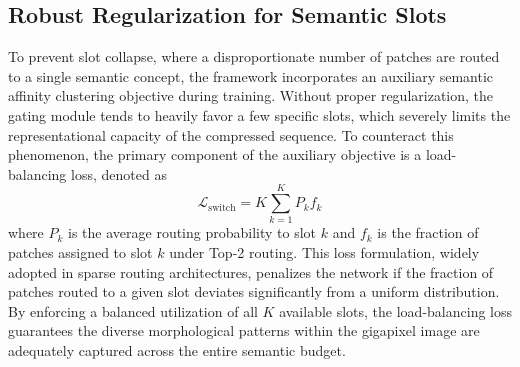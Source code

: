 \documentclass[runningheads]{llncs}
\begin{document}
\subsection{Robust Regularization for Semantic Slots}
To prevent slot collapse, where a disproportionate number of patches are routed to a single semantic concept, the framework incorporates an auxiliary semantic affinity clustering objective during training. Without proper regularization, the gating module tends to heavily favor a few specific slots, which severely limits the representational capacity of the compressed sequence. To counteract this phenomenon, the primary component of the auxiliary objective is a load-balancing loss, denoted as 
\begin{equation}
\mathcal{L}_{\text{switch}}
= K \sum_{k=1}^{K} P_k f_k
\end{equation}
where $P_k$ is the average routing probability to slot $k$ and $f_k$ is the fraction of patches assigned to slot $k$ under Top-2 routing. This loss formulation, widely adopted in sparse routing architectures, penalizes the network if the fraction of patches routed to a given slot deviates significantly from a uniform distribution. By enforcing a balanced utilization of all $K$ available slots, the load-balancing loss guarantees the diverse morphological patterns within the gigapixel image are adequately captured across the entire semantic budget.
\end{document}
